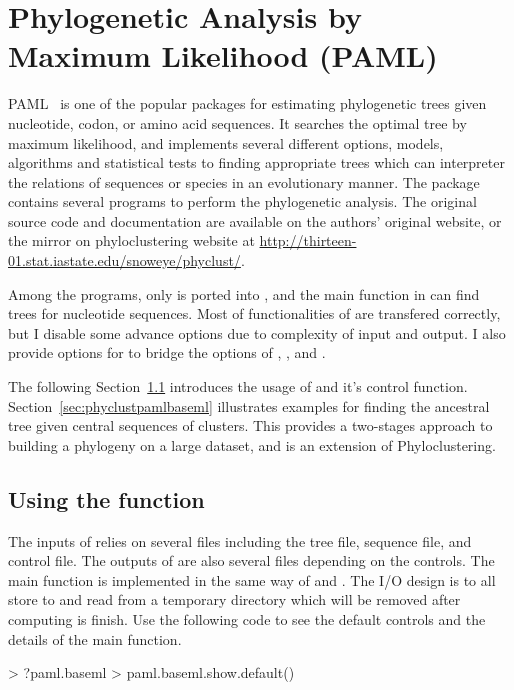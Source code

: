 
\section[Phylogenetic Analysis by Maximum Likelihood (PAML)]{Phylogenetic Analysis by Maximum Likelihood (PAML)}
\label{sec:paml}

PAML~\citep{Yang1997,Yang2007} is one of the popular packages for estimating
phylogenetic trees given nucleotide, codon, or amino acid sequences. It searches
the optimal tree by maximum likelihood, and implements several different
options, models, algorithms and statistical tests to finding appropriate
trees which can interpreter the relations of sequences or species in an
evolutionary manner. The package contains several programs to perform
the phylogenetic analysis.
The original source code and documentation are available on the authors'
original website, or the mirror on phyloclustering website at
\url{http://thirteen-01.stat.iastate.edu/snoweye/phyclust/}.

Among the programs, only  is ported into
, and the main function  in 
can find trees for nucleotide sequences.
Most of functionalities of  are transfered correctly, but I
disable some advance options due to complexity of input and output.
I also provide options for  to bridge the options of
, , and .

The following Section~\ref{sec:pamlbaseml} introduces the usage of
 and it's control function.
Section~\ref{sec:phyclustpamlbaseml} illustrates examples for finding the
ancestral tree given central sequences of clusters.
This provides a two-stages approach to building a phylogeny on a large dataset,
and is an extension of Phyloclustering.




\subsection[Using the paml.baseml() function]{Using the  function}
\label{sec:pamlbaseml}
 
The inputs of  relies on several files
including the tree file, sequence file, and control file. The outputs of 
are also several files depending on the controls.
The main function  is implemented in the same way of 
and . The I/O design is to all store to and read from a temporary
directory which will be removed after computing is finish.
Use the following code to see the default controls and the details of the
main function.
\begin{Code}
> ?paml.baseml
> paml.baseml.show.default()
\end{Code}

